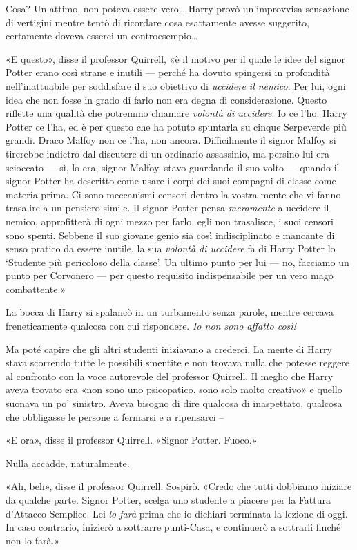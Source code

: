 Cosa? Un attimo, non poteva essere vero… Harry provò un’improvvisa sensazione di vertigini mentre tentò di ricordare cosa esattamente avesse suggerito, certamente doveva esserci un controesempio…

«E questo», disse il professor Quirrell, «è il motivo per il quale le idee del signor Potter erano così strane e inutili — perché ha dovuto spingersi in profondità nell’inattuabile per soddisfare il suo obiettivo di \textit{uccidere il nemico}. Per lui, ogni idea che non fosse in grado di farlo non era degna di considerazione. Questo riflette una qualità che potremmo chiamare \textit{volontà di uccidere}. Io ce l’ho. Harry Potter ce l’ha, ed è per questo che ha potuto spuntarla su cinque Serpeverde più grandi. Draco Malfoy non ce l’ha, non ancora. Difficilmente il signor Malfoy si tirerebbe indietro dal discutere di un ordinario assassinio, ma persino lui era scioccato — sì, lo era, signor Malfoy, stavo guardando il suo volto — quando il signor Potter ha descritto come usare i corpi dei suoi compagni di classe come materia prima. Ci sono meccanismi censori dentro la vostra mente che vi fanno trasalire a un pensiero simile. Il signor Potter pensa \textit{meramente} a uccidere il nemico, approfitterà di ogni mezzo per farlo, egli non trasalisce, i suoi censori sono spenti. Sebbene il suo giovane genio sia così indisciplinato e mancante di senso pratico da essere inutile, la sua \textit{volontà di uccidere} fa di Harry Potter lo ‘Studente più pericoloso della classe’. Un ultimo punto per lui — no, facciamo un punto per Corvonero — per questo requisito indispensabile per un vero mago combattente.»

La bocca di Harry si spalancò in un turbamento senza parole, mentre cercava freneticamente qualcosa con cui rispondere. \textit{Io non sono affatto così!}

Ma poté capire che gli altri studenti iniziavano a crederci. La mente di Harry stava scorrendo tutte le possibili smentite e non trovava nulla che potesse reggere al confronto con la voce autorevole del professor Quirrell. Il meglio che Harry aveva trovato era «non sono uno psicopatico, sono solo molto creativo» e quello suonava un po’ sinistro. Aveva bisogno di dire qualcosa di inaspettato, qualcosa che obbligasse le persone a fermarsi e a ripensarci –

«E ora», disse il professor Quirrell. «Signor Potter. Fuoco.»

Nulla accadde, naturalmente.

«Ah, beh», disse il professor Quirrell. Sospirò. «Credo che tutti dobbiamo iniziare da qualche parte. Signor Potter, scelga uno studente a piacere per la Fattura d’Attacco Semplice. Lei \textit{lo farà} prima che io dichiari terminata la lezione di oggi. In caso contrario, inizierò a sottrarre punti-Casa, e continuerò a sottrarli finché non lo farà.»

